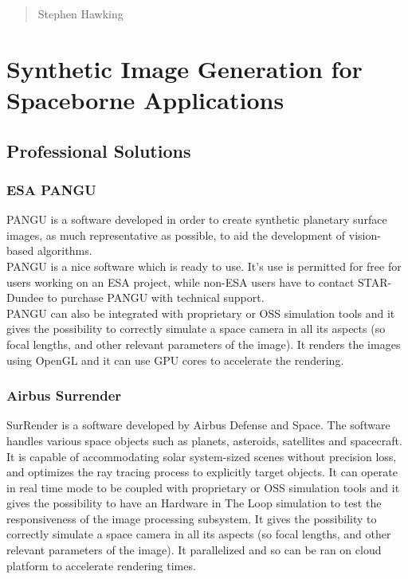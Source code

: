 \begin{quotation}
{\footnotesize
{}
\begin{flushright}
Stephen Hawking
\end{flushright}
}
\end{quotation}
\vspace{0.5cm}


\section{Synthetic Image Generation for Spaceborne Applications}

\subsection{Professional Solutions}

\subsubsection{ESA PANGU}

PANGU is a software developed in order to create synthetic planetary surface images, as much representative as possible, to aid the development of vision-based algorithms.\\
PANGU is a nice software which is ready to use. It's use is permitted for free for users working on an ESA project, while non-ESA users have to contact STAR-Dundee to purchase PANGU with technical support.\\
PANGU can also be integrated with proprietary or OSS simulation tools and it gives the possibility to correctly simulate a space camera in all its aspects (so focal lengths, and other relevant parameters of the image). It renders the images using OpenGL and it can use GPU cores to accelerate the rendering.

\subsubsection{Airbus Surrender}
SurRender is a software developed by Airbus Defense and Space. The software handles various space objects such as planets, asteroids, satellites and spacecraft.\\
It is capable of accommodating solar system-sized scenes without precision loss, and optimizes the ray tracing process to explicitly target objects. It can operate in real time mode to be coupled with  proprietary or OSS simulation tools and it gives the possibility to have an Hardware in The Loop simulation to test the responsiveness of the image processing subsystem. It gives the possibility to correctly simulate a space camera in all its aspects (so focal lengths, and other relevant parameters of the image). It parallelized and so can be ran on cloud platform to accelerate rendering times.\\

